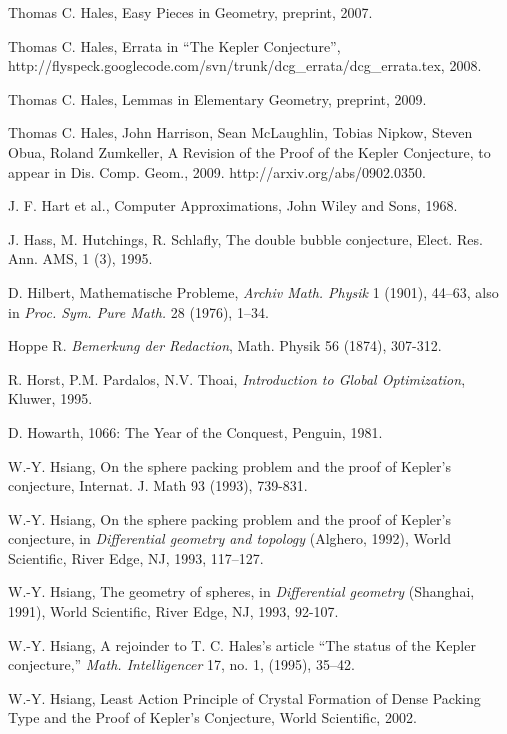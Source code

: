 \begin{thebibliography}{CHMS94}
 Thomas C. Hales, Easy Pieces in Geometry, preprint, 2007.

 Thomas C. Hales, Errata in ``The Kepler Conjecture'',
   http://flyspeck.googlecode.com/svn/trunk/dcg\_errata/dcg\_errata.tex, 2008.

 Thomas C. Hales, Lemmas in Elementary Geometry, 
   preprint, 2009.

 Thomas C. Hales, John Harrison, Sean McLaughlin, Tobias Nipkow, Steven Obua, Roland Zumkeller, A Revision of the Proof of the Kepler Conjecture, to appear in Dis. Comp. Geom., 2009.  http://arxiv.org/abs/0902.0350.

 J. F. Hart et al., Computer Approximations,
John Wiley and Sons, 1968.

 J. Hass, M. Hutchings, R. Schlafly, The double bubble conjecture,
   Elect. Res. Ann.  AMS, 1 (3), 1995.

 D. Hilbert, Mathematische Probleme, {\it Archiv Math. Physik} 1 (1901),
    44--63, also in {\it Proc. Sym. Pure Math.} 28 (1976), 1--34.

 Hoppe R. {\it Bemerkung der Redaction}, Math. Physik 56
(1874), 307-312.

 R. Horst, P.M. Pardalos, N.V. Thoai, {\it Introduction
    to Global Optimization}, Kluwer, 1995.

 D. Howarth, 1066: The Year of the Conquest, Penguin, 1981.

 W.-Y. Hsiang, On the sphere packing problem and the proof
    of Kepler's conjecture, Internat. J. Math 93 (1993), 739-831.

 W.-Y. Hsiang, On the sphere packing problem and the
    proof of Kepler's conjecture, in {\it Differential geometry and
    topology} (Alghero, 1992), World Scientific, River Edge,
    NJ, 1993,  117--127.

 W.-Y. Hsiang, The geometry of spheres, in {\it Differential
    geometry} (Shanghai, 1991), World Scientific, River Edge, NJ,
    1993, 92-107.

 W.-Y. Hsiang, A rejoinder to T. C. Hales's article ``The status
    of the Kepler conjecture,'' {\it Math. Intelligencer} 17, no. 1, (1995),
    35--42.

 W.-Y. Hsiang, Least Action Principle of Crystal Formation
of Dense Packing Type and the Proof of Kepler's Conjecture, World
Scientific, 2002.


\end{thebibliography}
